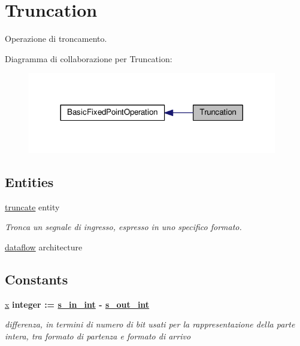 \hypertarget{group___truncation}{\section{Truncation}
\label{group___truncation}
}


Operazione di troncamento.  


Diagramma di collaborazione per Truncation\+:\nopagebreak
\begin{figure}[H]
\begin{center}
\leavevmode
\includegraphics[width=308pt]{group___truncation}
\end{center}
\end{figure}
\subsection*{Entities}
\begin{DoxyCompactItemize}
\item 
\hyperlink{classtruncate}{truncate} entity
\begin{DoxyCompactList}\small\item\em Tronca un segnale di ingresso, espresso in uno specifico formato. \end{DoxyCompactList}\item 
\hyperlink{classtruncate_1_1dataflow}{dataflow} architecture
\end{DoxyCompactItemize}
\subsection*{Constants}
 \begin{DoxyCompactItemize}
\item 
\hypertarget{group___truncation_ga63701d8af27da7452a7588efcff357bc}{\hyperlink{group___truncation_ga63701d8af27da7452a7588efcff357bc}{x} {\bfseries \textcolor{vhdlchar}{integer}\textcolor{vhdlchar}{ }\textcolor{vhdlchar}{ }\textcolor{vhdlchar}{\+:}\textcolor{vhdlchar}{=}\textcolor{vhdlchar}{ }\textcolor{vhdlchar}{ }\textcolor{vhdlchar}{ }\textcolor{vhdlchar}{ }{\bfseries \hyperlink{group___truncation_gabe72b503b8140ab0d84911165e959b53}{s\+\_\+in\+\_\+int}} \textcolor{vhdlchar}{-\/}\textcolor{vhdlchar}{ }\textcolor{vhdlchar}{ }\textcolor{vhdlchar}{ }{\bfseries \hyperlink{group___truncation_ga4ca792ca981e2f9d82bf36d9c82c08af}{s\+\_\+out\+\_\+int}} \textcolor{vhdlchar}{ }} }\label{group___truncation_ga63701d8af27da7452a7588efcff357bc}

\begin{DoxyCompactList}\small\item\em differenza, in termini di numero di bit usati per la rappresentazione della parte intera, tra formato di partenza e formato di arrivo \end{DoxyCompactList}\end{DoxyCompactItemize}
